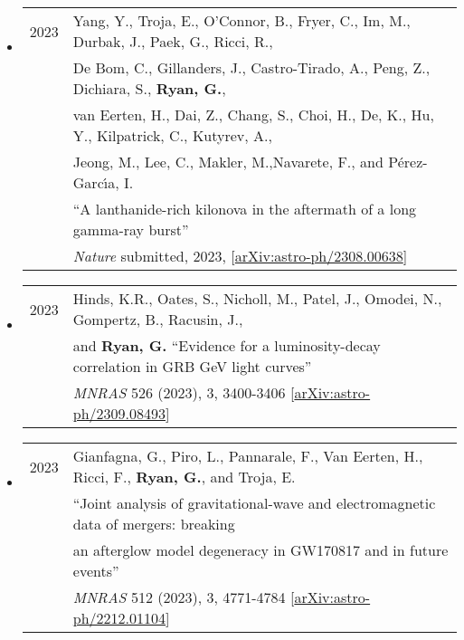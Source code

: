 \begin{itemize}
\item \begin{tabular}{ll}
2023 & {Yang}, Y., {Troja}, E., {O'Connor}, B., {Fryer}, C., {Im}, M., {Durbak}, J., {Paek}, G., {Ricci}, R., \\
	& {De Bom}, C., {Gillanders}, J., {Castro-Tirado}, A., {Peng}, Z., {Dichiara}, S., {\bf{Ryan}, G.}, \\
	&  {van Eerten}, H., {Dai}, Z.,  {Chang}, S., {Choi}, H., {De}, K., {Hu}, Y., {Kilpatrick}, C., {Kutyrev}, A., \\
	& {Jeong}, M., {Lee}, C.,  {Makler}, M.,{Navarete}, F., and {P{\'e}rez-Garc{\'\i}a}, I. \\
	& ``A lanthanide-rich kilonova in the aftermath of a long gamma-ray burst'' \\
	& \emph{Nature} submitted, 2023, [\href{https://arxiv.org/abs/2308.00638}{arXiv:astro-ph/2308.00638}]\\
\end{tabular}

\item \begin{tabular}{ll}
2023 & {Hinds}, K.R., {Oates}, S., {Nicholl}, M., {Patel}, J., {Omodei}, N., {Gompertz}, B., {Racusin}, J., \\
	& and {\bf {Ryan}, G.} ``Evidence for a luminosity-decay correlation in GRB GeV light curves'' \\
	& \emph{MNRAS} 526 (2023), 3, 3400-3406 [\href{https://arxiv.org/abs/2309.08493}{arXiv:astro-ph/2309.08493}]\\
\end{tabular}

\item \begin{tabular}{ll}
2023 & {Gianfagna}, G., {Piro}, L., {Pannarale}, F., {Van Eerten}, H., {Ricci}, F., {\bf {Ryan}, G.}, and {Troja}, E.\\
	&``Joint analysis of gravitational-wave and electromagnetic data of mergers: breaking \\
	& an afterglow model degeneracy in GW170817 and in future events'' \\
	& \emph{MNRAS} 512 (2023), 3, 4771-4784 [\href{https://arxiv.org/abs/2212.01104}{arXiv:astro-ph/2212.01104}]\\
\end{tabular}


\end{itemize}
